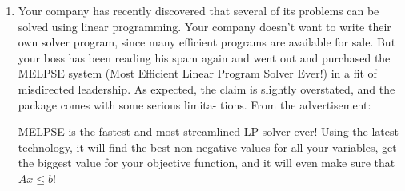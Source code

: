 \documentclass[11pt]{article}
\begin{document}
\begin{enumerate}
    \item  Your company has recently discovered that several of its problems can be solved using linear programming. Your company doesn’t want to write their own solver program, since many efficient programs are available for sale. But your boss has been reading his spam again and went out and purchased the MELPSE system (Most Efficient Linear Program Solver Ever!) in a fit of misdirected leadership. As expected, the claim is slightly overstated, and the package comes with some serious limita- tions. From the advertisement:

    \begin{center}
        MELPSE is the fastest and most streamlined LP solver ever! Using the latest technology, it will find the best non-negative values for all your variables, get the biggest value for your objective function, and it will even make sure that $Ax\leq b$!
    \end{center}


\end{enumerate}
\end{document}
